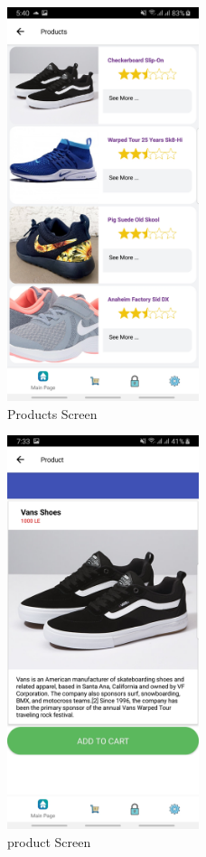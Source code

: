   \begin{figure}[htp]%
    \center%
    \includegraphics[width=0.5\textwidth]{images/Software/productsscreen.jpg}%
    \caption[Mobile Application:Products Screen]{Products Screen}\label{fig: productsscreen}%
  \end{figure}
  
    \begin{figure}[htp]%
    \center%
    \includegraphics[width=0.5\textwidth]{images/Software/product.jpg}%
    \caption[Mobile Application: product Screen]{product Screen}\label{fig: productPageScreen}%
  \end{figure}\newpage
  
